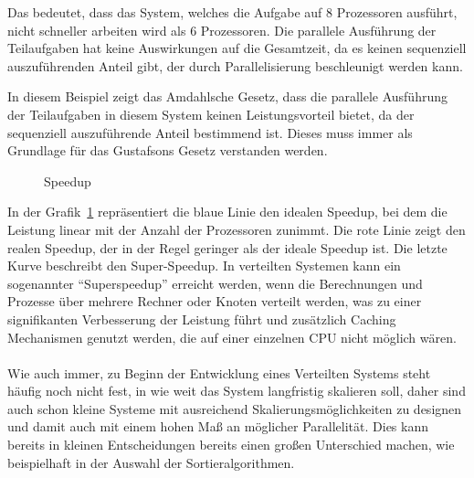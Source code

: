 \begin{itemize}
Das bedeutet, dass das System, welches die Aufgabe auf 8 Prozessoren ausführt, nicht schneller arbeiten wird als 6 Prozessoren. Die parallele Ausführung der Teilaufgaben hat keine Auswirkungen auf die Gesamtzeit, da es keinen sequenziell auszuführenden Anteil gibt, der durch Parallelisierung beschleunigt werden kann.

In diesem Beispiel zeigt das Amdahlsche Gesetz, dass die parallele Ausführung der Teilaufgaben in diesem System keinen Leistungsvorteil bietet, da der sequenziell auszuführende Anteil bestimmend ist. Dieses muss immer als Grundlage für das Gustafsons Gesetz verstanden werden.

\begin{figure}[!h]
\centering
{}
\caption{Speedup}
\label{fig:speedup}
\end{figure}

In der Grafik~\ref{fig:speedup} repräsentiert die blaue Linie den idealen Speedup, bei dem die Leistung linear mit der Anzahl der Prozessoren zunimmt. Die rote Linie zeigt den realen Speedup, der in der Regel geringer als der ideale Speedup ist. Die letzte Kurve beschreibt den Super-Speedup.
In verteilten Systemen kann ein sogenannter \enquote{Superspeedup} erreicht werden, wenn die Berechnungen und Prozesse über mehrere Rechner oder Knoten verteilt werden, was zu einer signifikanten Verbesserung der Leistung führt und zusätzlich Caching Mechanismen genutzt werden, die auf einer einzelnen CPU nicht möglich wären.\\
\\
Wie auch immer, zu Beginn der Entwicklung eines Verteilten Systems steht häufig noch nicht fest, in wie weit das System langfristig skalieren soll, daher sind auch schon kleine Systeme mit ausreichend Skalierungsmöglichkeiten zu designen und damit auch mit einem hohen Maß an möglicher Parallelität. Dies kann bereits in kleinen Entscheidungen bereits einen großen Unterschied machen, wie beispielhaft in der Auswahl der Sortieralgorithmen.


\end{itemize}
